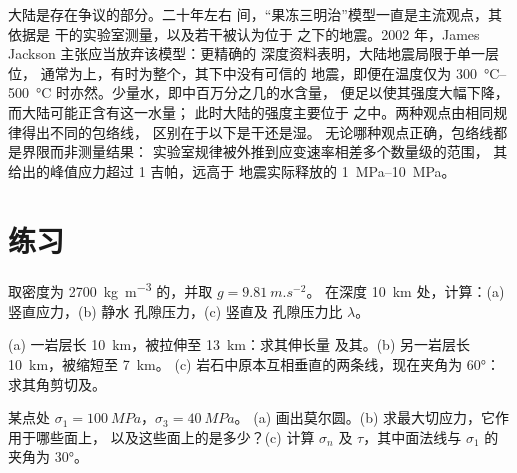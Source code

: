 大陆是存在争议的部分。二十年左右
间，“果冻三明治”模型一直是主流观点，其依据是
干的实验室测量，以及若干被认为位于
之下的地震。2002 年，James Jackson 主张应当放弃该模型：更精确的
深度资料表明，大陆地震局限于单一层位，
通常为上，有时为整个，其下中没有可信的
地震，即便在温度仅为
\qtyrange{300}{500}{\degreeCelsius} 时亦然。少量水，即中百万分之几的水含量，
便足以使其强度大幅下降，而大陆可能正含有这一水量；
此时大陆的强度主要位于
之中。两种观点由相同规律得出不同的包络线，
区别在于以下是干还是湿。
无论哪种观点正确，包络线都是界限而非测量结果：
实验室规律被外推到应变速率相差多个数量级的范围，
其给出的峰值应力超过 1 吉帕，远高于
地震实际释放的 \qtyrange{1}{10}{MPa}。

\section{练习}

\begin{exercise}[$\star$]\label{exo:b1:stress-strain-rheology:1}
取密度为 \qty{2700}{kg.m^{-3}} 的，并取 $g = \qty{9.81}{m.s^{-2}}$。
在深度 \qty{10}{km} 处，计算：(a) 竖直应力，(b) 静水
孔隙压力，(c) 竖直及
孔隙压力比 $\lambda$。
\end{exercise}

\begin{exercise}[$\star$]\label{exo:b1:stress-strain-rheology:2}
(a) 一岩层长 \qty{10}{km}，被拉伸至 \qty{13}{km}：求其伸长量
及其。(b) 另一岩层长 \qty{10}{km}，被缩短至 \qty{7}{km}。
(c) 岩石中原本互相垂直的两条线，现在夹角为
\ang{60}：求其角剪切及。
\end{exercise}

\begin{exercise}[$\star$]\label{exo:b1:stress-strain-rheology:3}
某点处 $\sigma_1 = \qty{100}{MPa}$，$\sigma_3 = \qty{40}{MPa}$。
(a) 画出莫尔圆。(b) 求最大切应力，它作用于哪些面上，
以及这些面上的是多少？(c) 计算 $\sigma_n$
及 $\tau$，其中面法线与 $\sigma_1$ 的夹角为 \ang{30}。
\end{exercise}

